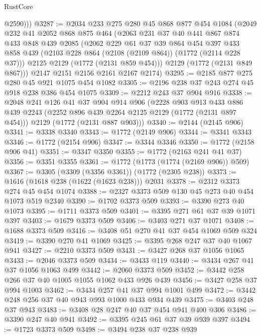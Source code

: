 \begin{lexlean}{RustCore}
\begin{coremodule}
          @2590)))
@3287 := @2034
    @233
    @275
    @280
    @45
    @868
    @877
    @454
    @1084
    (@2049
      @232
      @41
      @2052
      @868
      @875
      @464
      (@2063
        @231
        @37
        @40
        @441
        @867
        @874
        @433
        @848
        @439
        @2085
        (@2062
          @229
          @61
          @37
          @39
          @864
          @454
          @397
          @433
          @858
          @439
          (@2103 @228 @864 (@2108 (@2109 @864)) (@1772 (@2114 @228 @37)))
          @2125
          @2129
          (@1772 (@2131 @859 @454)))
        @2129
        (@1772 (@2131 @849 @867)))
      @2147
      @2151
      @2156
      @2161
      @2167
      @2174)
@3295 := @2185 @877 @275 @280 @45 @921 @1075 @454 @1082
@3305 := @2196 @238 @37 @243 @274 @45 @918 @238 @386 @454 @1075
@3309 := @2212 @243 @37 @904 @916
@3338 := @2048
    @241
    @126
    @41
    @37
    @904
    @914
    @906
    (@2228
      @903
      @913
      @433
      @886
      @439
      @2243
      (@2252 @896 @439 @2264 @2125 @2129 (@1772 (@2131 @897 @454)))
      @2129
      (@1772 (@2131 @887 @903)))
@3340 := @2144 (@2145 @906)
@3341 := @3338 @3340
@3343 := @1772 (@2149 @906)
@3344 := @3341 @3343
@3346 := @1772 (@2154 @906)
@3347 := @3344 @3346
@3350 := @1772 (@2158 @906 @41)
@3351 := @3347 @3350
@3355 := @1772 (@2163 @241 @41 @37)
@3356 := @3351 @3355
@3361 := @1772 (@1773 (@1774 (@2169 @906)) @509)
@3367 := @3305 (@3309 (@3356 @3361)) (@1772 (@2305 @238))
@3373 := @1616 (@1618 @238 (@1622 (@1623 @238))) @2031
@3378 := @2312 @3373 @274 @45 @454 @1074
@3388 := @2327 @3373 @509 @130 @45 @273 @40 @454 @1073 @519 @2340
@3390 := @1702 @3373 @509
@3393 := @3390 @273 @40 @1073
@3395 := @1711 @3373 @509
@3401 := @3395 @271 @61 @37 @39 @1071 @397
@3403 := @1679 @3373 @509
@3406 := @3403 @271 @37 @1071
@3408 := @1688 @3373 @509
@3416 := @3408 @51 @270 @41 @37 @454 @1069 @509 @324
@3419 := @3390 @270 @41 @1069
@3425 := @3395 @268 @247 @37 @40 @1067 @941
@3427 := @2210 @3373 @509
@3431 := @3427 @268 @37 @1056 @1065
@3433 := @2046 @3373 @509
@3434 := @3433 @119
@3440 := @3434 @267 @41 @37 @1056 @1063 @499
@3442 := @2060 @3373 @509
@3452 := @3442 @258 @266 @37 @40 @1005 @1055 @1062 @433 @926 @439
@3456 := @3427 @258 @37 @994 @1003
@3462 := @3434 @257 @41 @37 @994 @1001 @499
@3472 := @3442 @248 @256 @37 @40 @943 @993 @1000 @433 @934 @439
@3475 := @3403 @248 @37 @943
@3483 := @3408 @28 @247 @40 @37 @454 @941 @400 @306
@3486 := @3390 @247 @40 @941
@3492 := @3395 @245 @61 @37 @39 @939 @397
@3494 := @1723 @3373 @509
@3498 := @3494 @238 @37 @238 @939

\end{coremodule}
\end{lexlean}
